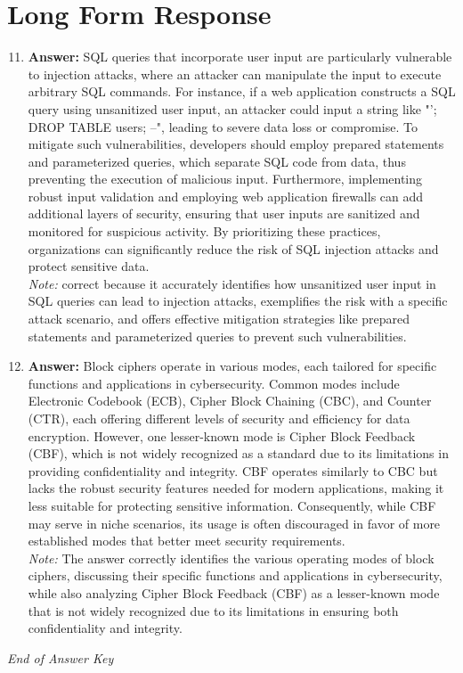 \documentclass[12pt]{article}
\begin{document}
\section*{Long Form Response}
\begin{enumerate}[label=\arabic*.]
\setcounter{enumi}{10}
\item \textbf{Answer:} SQL queries that incorporate user input are particularly vulnerable to injection attacks, where an attacker can manipulate the input to execute arbitrary SQL commands. For instance, if a web application constructs a SQL query using unsanitized user input, an attacker could input a string like "'; DROP TABLE users; --", leading to severe data loss or compromise. To mitigate such vulnerabilities, developers should employ prepared statements and parameterized queries, which separate SQL code from data, thus preventing the execution of malicious input. Furthermore, implementing robust input validation and employing web application firewalls can add additional layers of security, ensuring that user inputs are sanitized and monitored for suspicious activity. By prioritizing these practices, organizations can significantly reduce the risk of SQL injection attacks and protect sensitive data.
\\ \textit{Note:} correct because it accurately identifies how unsanitized user input in SQL queries can lead to injection attacks, exemplifies the risk with a specific attack scenario, and offers effective mitigation strategies like prepared statements and parameterized queries to prevent such vulnerabilities.
\item \textbf{Answer:} Block ciphers operate in various modes, each tailored for specific functions and applications in cybersecurity. Common modes include Electronic Codebook (ECB), Cipher Block Chaining (CBC), and Counter (CTR), each offering different levels of security and efficiency for data encryption. However, one lesser-known mode is Cipher Block Feedback (CBF), which is not widely recognized as a standard due to its limitations in providing confidentiality and integrity. CBF operates similarly to CBC but lacks the robust security features needed for modern applications, making it less suitable for protecting sensitive information. Consequently, while CBF may serve in niche scenarios, its usage is often discouraged in favor of more established modes that better meet security requirements.
\\ \textit{Note:} The answer correctly identifies the various operating modes of block ciphers, discussing their specific functions and applications in cybersecurity, while also analyzing Cipher Block Feedback (CBF) as a lesser-known mode that is not widely recognized due to its limitations in ensuring both confidentiality and integrity.
\end{enumerate}

\vfill
\noindent\textit{End of Answer Key}
\end{document}

